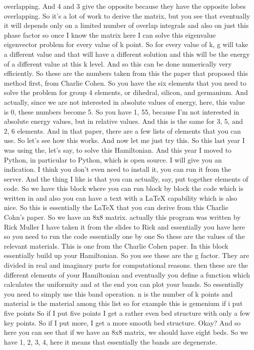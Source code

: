 overlapping. And 4 and 3 give the opposite because they have the opposite lobes overlapping. So it's a lot of work to derive the matrix, but you see that eventually it will depends only on a limited number of overlap integrals and also on just this phase factor so once I know the matrix here I can solve this eigenvalue eigenvector problem for every value of k point. So for every value of k, g will take a different value and that will have a different solution and this will be the energy of a different value at this k level. And so this can be done numerically very efficiently.
So these are the numbers taken from this the paper that proposed this method first, from Charlie Cohen. So you have the six elements that you need to solve the problem for group 4 elements, or dihedral, silicon, and germanium. And actually, since we are not interested in absolute values of energy, here, this value is 0, these numbers become 5. So you have 1, 55, because I'm not interested in absolute energy values, but in relative values. And this is the same for 3, 5, and 2, 6 elements. And in that paper, there are a few lists of elements that you can use. So let's see how this works. And now let me just try this. So this last year I was using the, let's say, to solve this Hamiltonian. And this year I moved to Python, in particular to Python, which is open source. I will give you an indication. I think you don't even need to install it, you can run it from the server. And the thing I like is that you can actually, say, put together elements of code. So we have this block where you can run block by block the code which is written in and also you can have a text with a LaTeX capability which is also nice. So this is essentially the LaTeX that you can derive from this Charlie Cohn's paper. So we have an 8x8 matrix. actually this program was written by Rick Muller I have taken it from the slides to Rick and essentially you have here so you need to run the code essentially one by one So these are the values of the relevant materials. This is one from the Charlie Cohen paper. In this block essentially build up your Hamiltonian. So you see these are the g factor. They are divided in real and imaginary parts for computational reasons. then these are the different elements of your Hamiltonian and eventually you define a function which calculates the uniformity and at the end you can plot your bands. So essentially you need to simply use this band operation. n is the number of k points and material is the material among this list so for example this is gemenium if i put five points So if I put five points I get a rather even bed structure with only a few key points. So if I put more, I get a more smooth bed structure. Okay? And so here you can see that if we have an 8x8 matrix, we should have eight beds. So we have 1, 2, 3, 4, here it means that essentially the bands are degenerate.
